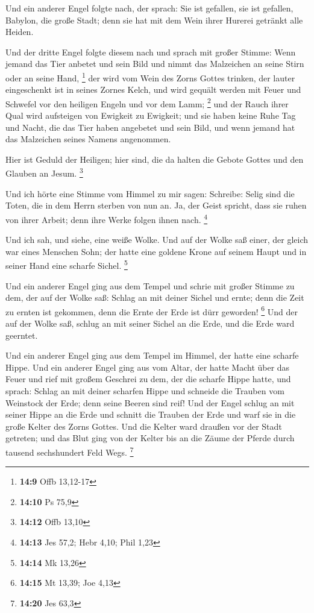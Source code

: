  Und ein anderer Engel folgte nach, der sprach: Sie ist
gefallen, sie ist gefallen, Babylon, die große Stadt; denn sie hat mit
dem Wein ihrer Hurerei getränkt alle Heiden.

 Und der dritte Engel folgte diesem nach und sprach mit
großer Stimme: Wenn jemand das Tier anbetet und sein Bild und nimmt das
Malzeichen an seine Stirn oder an seine Hand, \footnote{\textbf{14:9}
  Offb 13,12-17}  der wird vom Wein des Zorns Gottes
trinken, der lauter eingeschenkt ist in seines Zornes Kelch, und wird
gequält werden mit Feuer und Schwefel vor den heiligen Engeln und vor
dem Lamm; \footnote{\textbf{14:10} Ps 75,9}  und der
Rauch ihrer Qual wird aufsteigen von Ewigkeit zu Ewigkeit; und sie haben
keine Ruhe Tag und Nacht, die das Tier haben angebetet und sein Bild,
und wenn jemand hat das Malzeichen seines Namens angenommen.

 Hier ist Geduld der Heiligen; hier sind, die da halten
die Gebote Gottes und den Glauben an Jesum. \footnote{\textbf{14:12}
  Offb 13,10}

 Und ich hörte eine Stimme vom Himmel zu mir sagen:
Schreibe: Selig sind die Toten, die in dem Herrn sterben von nun an. Ja,
der Geist spricht, dass sie ruhen von ihrer Arbeit; denn ihre Werke
folgen ihnen nach. \footnote{\textbf{14:13} Jes 57,2; Hebr 4,10; Phil
  1,23}

 Und ich sah, und siehe, eine weiße Wolke. Und auf der
Wolke saß einer, der gleich war eines Menschen Sohn; der hatte eine
goldene Krone auf seinem Haupt und in seiner Hand eine scharfe Sichel.
\footnote{\textbf{14:14} Mk 13,26}

 Und ein anderer Engel ging aus dem Tempel und schrie mit
großer Stimme zu dem, der auf der Wolke saß: Schlag an mit deiner Sichel
und ernte; denn die Zeit zu ernten ist gekommen, denn die Ernte der Erde
ist dürr geworden! \footnote{\textbf{14:15} Mt 13,39; Joe 4,13}
 Und der auf der Wolke saß, schlug an mit seiner Sichel
an die Erde, und die Erde ward geerntet.

 Und ein anderer Engel ging aus dem Tempel im Himmel, der
hatte eine scharfe Hippe.  Und ein anderer Engel ging aus
vom Altar, der hatte Macht über das Feuer und rief mit großem Geschrei
zu dem, der die scharfe Hippe hatte, und sprach: Schlag an mit deiner
scharfen Hippe und schneide die Trauben vom Weinstock der Erde; denn
seine Beeren sind reif!  Und der Engel schlug an mit
seiner Hippe an die Erde und schnitt die Trauben der Erde und warf sie
in die große Kelter des Zorns Gottes.  Und die Kelter
ward draußen vor der Stadt getreten; und das Blut ging von der Kelter
bis an die Zäume der Pferde durch tausend sechshundert Feld Wegs.
\footnote{\textbf{14:20} Jes 63,3}

